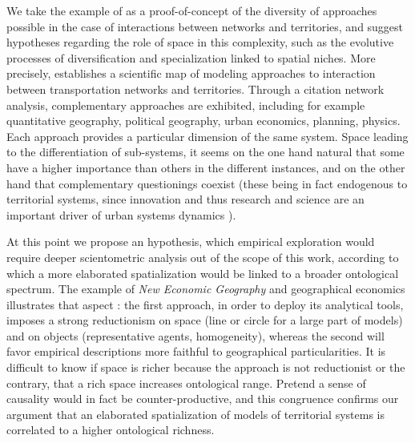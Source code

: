 \documentclass[11pt]{article}
\begin{document}
We take the example of \cite{raimbault2017invisible} as a proof-of-concept of the diversity of approaches possible in the case of interactions between networks and territories, and suggest hypotheses regarding the role of space in this complexity, such as the evolutive processes of diversification and specialization linked to spatial niches. More precisely, \cite{raimbault2017invisible} establishes a scientific map of modeling approaches to interaction between transportation networks and territories. Through a citation network analysis, complementary approaches are exhibited, including for example quantitative geography, political geography, urban economics, planning, physics. Each approach provides a particular dimension of the same system. Space leading to the differentiation of sub-systems, it seems on the one hand natural that some have a higher importance than others in the different instances, and on the other hand that complementary questionings coexist (these being in fact endogenous to territorial systems, since innovation and thus research and science are an important driver of urban systems dynamics \citep{pumain2010theorie}).


At this point we propose an hypothesis, which empirical exploration would require deeper scientometric analysis out of the scope of this work, according to which a more elaborated spatialization would be linked to a broader ontological spectrum. The example of \emph{New Economic Geography} and geographical economics illustrates that aspect \citep{marchionni2004geographical}: the first approach, in order to deploy its analytical tools, imposes a strong reductionism on space (line or circle for a large part of models) and on objects (representative agents, homogeneity), whereas the second will favor empirical descriptions more faithful to geographical particularities. It is difficult to know if space is richer because the approach is not reductionist or the contrary, that a rich space increases ontological range. Pretend a sense of causality would in fact be counter-productive, and this congruence confirms our argument that an elaborated spatialization of models of territorial systems is correlated to a higher ontological richness.
\end{document}
